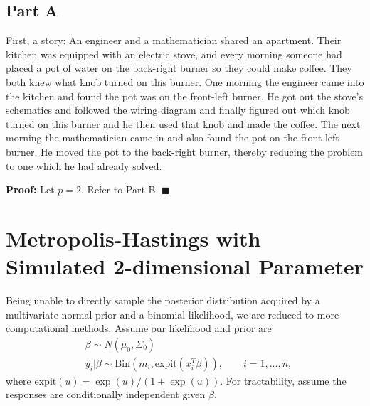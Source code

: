 \documentclass[12pt]{article}
\begin{document}
\subsection*{Part A}
First, a story: An engineer and a mathematician shared an apartment. Their kitchen was equipped with an electric stove, and every morning someone had placed a pot of water on the back-right burner so they could make coffee. They both knew what knob turned on this burner. One morning the engineer came into the kitchen and found the pot was on the front-left burner. He got out the stove's schematics and followed the wiring diagram and finally figured out which knob turned on this burner and he then used that knob and made the coffee. The next morning the mathematician came in and also found the pot on the front-left burner. He moved the pot to the back-right burner, thereby reducing the problem to one which he had already solved.

\noindent \textbf{Proof:} Let $p=2$. Refer to Part B. $\blacksquare$

\section*{Metropolis-Hastings with Simulated 2-dimensional Parameter}
Being unable to directly sample the posterior distribution acquired by a multivariate normal prior and a binomial likelihood, we are reduced to more computational methods. Assume our likelihood and prior are
\begin{align*}
& \beta \sim N(\mu_0, \Sigma_0) \\
& y_{i} | \beta \sim \textrm{Bin}(m_{i},\textrm{expit}(x_{i}^{T}\beta)) , \qquad i=1, \ldots, n,
\end{align*}
where $\text{expit}(u) = \exp(u) / (1+\exp(u))$. For tractability, assume the responses are conditionally independent given $\beta$.
\end{document}
